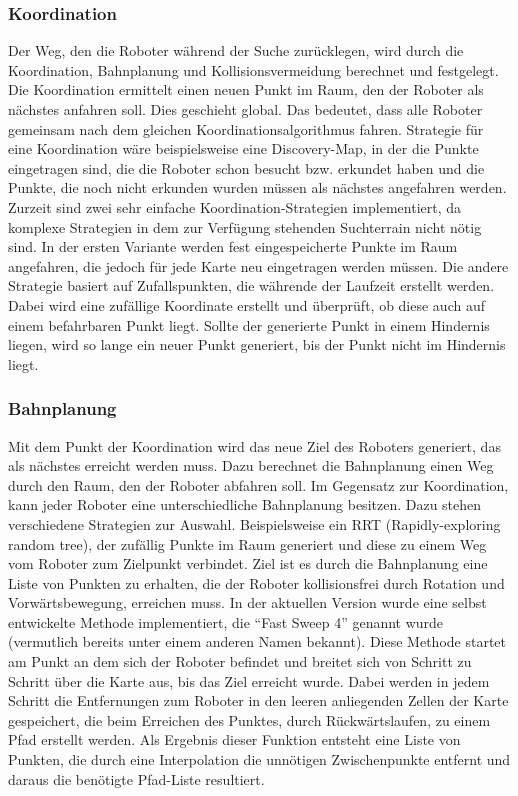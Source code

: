\subsubsection{Koordination}
Der Weg, den die Roboter während der Suche zurücklegen, wird durch die Koordination, Bahnplanung und Kollisionsvermeidung berechnet und festgelegt. Die Koordination ermittelt einen neuen Punkt im Raum, den der Roboter als nächstes anfahren soll. Dies geschieht global. Das bedeutet, dass alle Roboter gemeinsam nach dem gleichen Koordinationsalgorithmus fahren. Strategie für eine Koordination wäre beispielsweise eine Discovery-Map, in der die Punkte eingetragen sind, die die Roboter schon besucht bzw. erkundet haben und die Punkte, die noch nicht erkunden wurden müssen als nächstes angefahren werden. Zurzeit sind zwei sehr einfache Koordination-Strategien implementiert, da komplexe Strategien in dem zur Verfügung stehenden Suchterrain nicht nötig sind. In der ersten Variante werden fest eingespeicherte Punkte im Raum angefahren, die jedoch für jede Karte neu eingetragen werden müssen. Die andere Strategie basiert auf Zufallspunkten, die währende der Laufzeit erstellt werden. Dabei wird eine zufällige Koordinate erstellt und überprüft, ob diese auch auf einem befahrbaren Punkt liegt. Sollte der generierte Punkt in einem Hindernis liegen, wird so lange ein neuer Punkt generiert, bis der Punkt nicht im Hindernis liegt.\\
\subsubsection{Bahnplanung}
Mit dem Punkt der Koordination wird das neue Ziel des Roboters generiert, das als nächstes erreicht werden muss. Dazu berechnet die Bahnplanung einen Weg durch den Raum, den der Roboter abfahren soll. Im Gegensatz zur Koordination, kann jeder Roboter eine unterschiedliche Bahnplanung besitzen. Dazu stehen verschiedene Strategien zur Auswahl. Beispielsweise ein RRT (Rapidly-exploring random tree), der zufällig Punkte im Raum generiert und diese zu einem Weg vom Roboter zum Zielpunkt verbindet. Ziel ist es durch die Bahnplanung eine Liste von Punkten zu erhalten, die der Roboter kollisionsfrei durch Rotation und Vorwärtsbewegung, erreichen muss. In der aktuellen Version wurde eine selbst entwickelte Methode implementiert, die "`Fast Sweep 4"' genannt wurde (vermutlich bereits unter einem anderen Namen bekannt). Diese Methode startet am Punkt an dem sich der Roboter befindet und breitet sich von Schritt zu Schritt über die Karte aus, bis das Ziel erreicht wurde. Dabei werden in jedem Schritt die Entfernungen zum Roboter in den leeren anliegenden Zellen der Karte gespeichert, die beim Erreichen des Punktes, durch Rückwärtslaufen, zu einem Pfad erstellt werden. Als Ergebnis dieser Funktion entsteht eine Liste von Punkten, die durch eine Interpolation die unnötigen Zwischenpunkte entfernt und daraus die benötigte Pfad-Liste resultiert.\\
